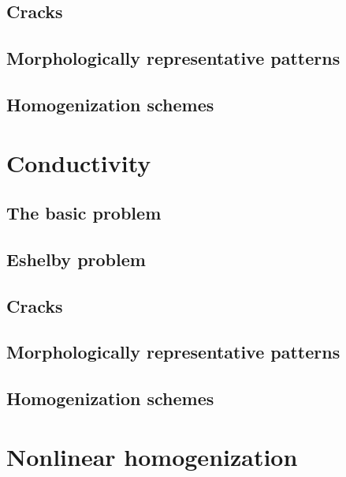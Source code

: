 \documentclass[
  letterpaper,
  DIV=11,
  numbers=noendperiod]{scrreprt}
\begin{document}
\hypertarget{sec-cracks_elas}{%
\chapter{Cracks}\label{sec-cracks_elas}}

\hypertarget{sec-mrp_elas}{%
\chapter{Morphologically representative patterns}\label{sec-mrp_elas}}

\hypertarget{sec-schemes_elas}{%
\chapter{Homogenization schemes}\label{sec-schemes_elas}}

\part{Conductivity}

\hypertarget{sec-basics_elas}{%
\chapter{The basic problem}\label{sec-basics_elas}}

\hypertarget{sec-eshelby_cond}{%
\chapter{Eshelby problem}\label{sec-eshelby_cond}}

\hypertarget{sec-cracks_cond}{%
\chapter{Cracks}\label{sec-cracks_cond}}

\hypertarget{sec-mrp_cond}{%
\chapter{Morphologically representative patterns}\label{sec-mrp_cond}}

\hypertarget{sec-schemes_cond}{%
\chapter{Homogenization schemes}\label{sec-schemes_cond}}

\part{Nonlinear homogenization}
\end{document}
